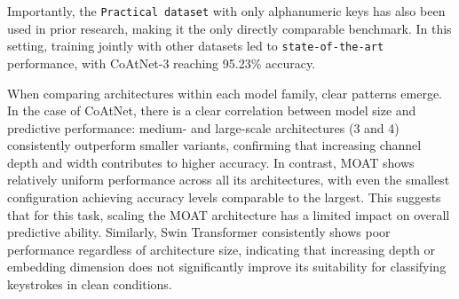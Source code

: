 \documentclass[a4paper,11pt,twoside]{report}
\theoremstyle{definition}
\begin{document}
Importantly, the \texttt{Practical dataset} with only alphanumeric keys has also been used in prior research, making it the only directly comparable benchmark. In this setting, training jointly with other datasets led to \texttt{state-of-the-art} performance, with CoAtNet-3 reaching 95.23\% accuracy.

When comparing architectures within each model family, clear patterns emerge. In the case of CoAtNet, there is a clear correlation between model size and predictive performance: medium- and large-scale architectures (3 and 4) consistently outperform smaller variants, confirming that increasing channel depth and width contributes to higher accuracy. In contrast, MOAT shows relatively uniform performance across all its architectures, with even the smallest configuration achieving accuracy levels comparable to the largest. This suggests that for this task, scaling the MOAT architecture has a limited impact on overall predictive ability. Similarly, Swin Transformer consistently shows poor performance regardless of architecture size, indicating that increasing depth or embedding dimension does not significantly improve its suitability for classifying keystrokes in clean conditions.
\end{document}

